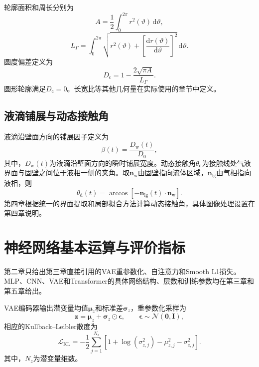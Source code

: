 轮廓面积和周长分别为
\begin{equation}
A
=
\frac{1}{2}\int_0^{2\pi}r^2(\vartheta)\,\mathrm d\vartheta,
\label{eq:ch2_fourier_area}
\end{equation}
\begin{equation}
L_{\Gamma}
=
\int_0^{2\pi}
\sqrt{
r^2(\vartheta)
+
\left[\frac{\mathrm dr(\vartheta)}{\mathrm d\vartheta}\right]^2}
\,\mathrm d\vartheta.
\label{eq:ch2_fourier_perimeter}
\end{equation}
圆度偏差定义为
\begin{equation}
D_{\mathrm c}
=
1-
\frac{2\sqrt{\pi A}}{L_{\Gamma}}.
\label{eq:ch2_circularity_deviation}
\end{equation}
圆形轮廓满足$D_{\mathrm c}=0$。长宽比等其他几何量在实际使用的章节中定义。

\subsection{液滴铺展与动态接触角}

液滴沿壁面方向的铺展因子定义为
\begin{equation}
\beta(t)
=
\frac{D_{\mathrm w}(t)}{D_0},
\label{eq:ch2_spreading_factor}
\end{equation}
其中，$D_{\mathrm w}(t)$为液滴沿壁面方向的瞬时铺展宽度。动态接触角$\theta_{\mathrm d}$为接触线处气液界面与固壁之间位于液相一侧的夹角。取$\boldsymbol{n}_{\mathrm w}$由固壁指向流体区域，$\boldsymbol{n}_{\mathrm{lg}}$由气相指向液相，则
\begin{equation}
\theta_{\mathrm d}(t)
=
\arccos\left[
-\boldsymbol{n}_{\mathrm{lg}}(t)\cdot\boldsymbol{n}_{\mathrm w}
\right].
\label{eq:ch2_dynamic_contact_angle}
\end{equation}
第四章根据统一的界面提取和局部拟合方法计算动态接触角，具体图像处理设置在第四章说明。

\section{神经网络基本运算与评价指标}

第二章只给出第三章直接引用的VAE重参数化、自注意力和Smooth L1损失。MLP、CNN、VAE和Transformer的具体网络结构、层数和训练参数均在第三章和第五章给出。

VAE编码器输出潜变量均值$\boldsymbol{\mu}_z$和标准差$\boldsymbol{\sigma}_z$，重参数化采样为
\begin{equation}
\boldsymbol{z}
=
\boldsymbol{\mu}_z
+
\boldsymbol{\sigma}_z\odot\boldsymbol{\epsilon},
\qquad
\boldsymbol{\epsilon}\sim\mathcal{N}(\boldsymbol{0},\boldsymbol{I}),
\label{eq:ch2_vae_reparameterization}
\end{equation}
相应的Kullback--Leibler散度为
\begin{equation}
\mathcal{L}_{\mathrm{KL}}
=
-\frac{1}{2}
\sum_{j=1}^{N_z}
\left[
1+\log\left(\sigma_{z,j}^2\right)
-\mu_{z,j}^2
-\sigma_{z,j}^2
\right].
\label{eq:ch2_vae_kl}
\end{equation}
其中，$N_z$为潜变量维数\cite{kingma2014vae}。

